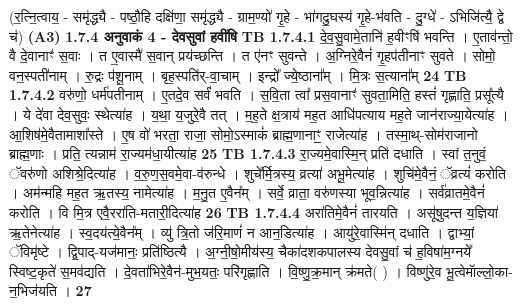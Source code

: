 \documentclass[17pt]{extarticle}
\begin{document}
                  \newline
                                    (र॒त्नि॒त्वाय॒ - समृ॑द्ध्यै - पष्ठौ॒हि दक्षि॑णा॒ समृ॑द्ध्यै - ग्राम॒ण्यो॑ गृ॒हे - भा॑गदु॒घस्य॑ गृ॒हे-भ॑वति - दु॒ग्धे॑ - ऽभिजि॑त्यै॒ द्वे च॑) \textbf{(A3)} \newline \newline
                \textbf{ 1.7.4     अनुवाकं   4 - देवसुवां हवींषि} \newline
                                \textbf{ TB 1.7.4.1} \newline
                  दे॒व॒सु॒वामे॒तानि॑ ह॒वीꣳषि॑ भवन्ति । ए॒ताव॑न्तो॒ वै दे॒वानाꣳ॑ स॒वाः । त ए॒वास्मै॑ स॒वान् प्रय॑च्छन्ति । त ए॑नꣳ सुवन्ते । अ॒ग्निरे॒वैनं॑ गृ॒हप॑तीनाꣳ सुवते । सोमो॒ वन॒स्पती॑नाम् । रु॒द्रः प॑शू॒नाम् । बृह॒स्पति॑र्-वा॒चाम् । इन्द्रो᳚ ज्ये॒ष्ठाना᳚म् । मि॒त्रः स॒त्याना᳚म् \textbf{ 24} \newline
                  \newline
                                \textbf{ TB 1.7.4.2} \newline
                  वरु॑णो॒ धर्म॑पतीनाम् । ए॒तदे॒व सर्वं॑ भवति । स॒वि॒ता त्वा᳚ प्रस॒वानाꣳ॑ सुवता॒मिति॒ हस्तं॑ गृह्णाति॒ प्रसू᳚त्यै । ये दे॑वा देव॒सुवः॒ स्थेत्या॑ह । य॒था॒ य॒जुरे॒वै तत् । म॒ह॒ते क्ष॒त्राय॑ मह॒त आधि॑पत्याय मह॒ते जान॑राज्या॒येत्या॑ह । आ॒शिष॑मे॒वैतामाशा᳚स्ते । ए॒ष वो॑ भरता॒ राजा॒ सोमो॒ऽस्माकं॑ ब्राह्म॒णानाꣳ॒॒ राजेत्या॑ह । तस्मा॒थ्-सोम॑राजानो ब्राह्म॒णाः । प्रति॒ त्यन्नाम॑ रा॒ज्यम॑धा॒यीत्या॑ह \textbf{ 25} \newline
                  \newline
                                \textbf{ TB 1.7.4.3} \newline
                  रा॒ज्यमे॒वास्मि॒न् प्रति॑ दधाति । स्वां त॒नुवं॒ ॅवरु॑णो अशिश्रे॒दित्या॑ह । व॒रु॒ण॒स॒वमे॒वा-व॑रुन्धे । शुचे᳚र्मि॒त्रस्य॒ व्रत्या॑ अभू॒मेत्या॑ह । शुचि॑मे॒वैनं॒ ॅव्रत्यं॑ करोति । अम॑न्महि मह॒त ऋ॒तस्य॒ नामेत्या॑ह । म॒नु॒त ए॒वैन᳚म् । सर्वे॒ व्राता॒ वरु॑णस्या भूव॒न्नित्या॑ह । सर्व॑व्रातमे॒वैनं॑ करोति । वि मि॒त्र एवै॒ररा॑ति-मतारी॒दित्या॑ह \textbf{ 26} \newline
                  \newline
                                \textbf{ TB 1.7.4.4} \newline
                  अरा॑तिमे॒वैनं॑ तारयति । असू॑षुदन्त य॒ज्ञिया॑ ऋ॒तेनेत्या॑ह । स्व॒दय॑त्ये॒वैन᳚म् । व्यु॑ त्रि॒तो ज॑रि॒माणं॑ न आन॒डित्या॑ह । आयु॑रे॒वास्मि॑न् दधाति । द्वाभ्यां॒ ॅविमृ॑ष्टे । द्वि॒पाद्-यज॑मानः॒ प्रति॑ष्ठित्यै । अ॒ग्नी॒षो॒मीय॑स्य॒ चैका॑दशकपालस्य देवसु॒वां च॑ ह॒विषा॑म॒ग्नये᳚ स्विष्ट॒कृते॑ स॒मव॑द्यति । दे॒वता॑भिरे॒वैन॑-मुभ॒यतः॒ परि॑गृह्णाति । वि॒ष्णु॒क्र॒मान् क्र॑मते( ) । विष्णु॑रे॒व भू॒त्वेमाॅल्लो॒का-न॒भिज॑यति । \textbf{ 27} \newline
\end{document}
